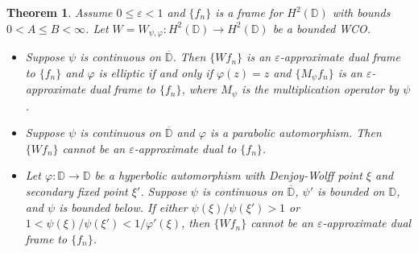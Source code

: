 \documentclass{amsart}
\newtheorem{thm}{Theorem}[section]
\theoremstyle{definition}
\theoremstyle{remark}
\numberwithin{equation}{section}
\begin{document}
\begin{thm}\label{approx_dual}
    Assume $0\leq \varepsilon< 1$ and $\{f_{n}\}$ is a frame for $H^{2}(\mathbb{D})$ with bounds $0<A\leq B<\infty$. Let $W=W_{\psi,\varphi}:H^{2}(\mathbb{D})\to H^{2}(\mathbb{D})$ be a bounded WCO. 
    \begin{itemize}
        \item[1.] Suppose $\psi$ is continuous on $\overline{\mathbb{D}}$. Then $\{Wf_{n}\}$ is an $\varepsilon$-approximate dual frame to $\{f_{n}\}$ and $\varphi$ is elliptic if and only if $\varphi(z)=z$ and $\{M_{\psi}f_{n}\}$ is an $\varepsilon$-approximate dual frame to $\{f_{n}\}$, where $M_{\psi}$ is the multiplication operator by $\psi$.
        \item[2.] Suppose $\psi$ is continuous on $\overline{\mathbb{D}}$ and $\varphi$ is a parabolic automorphism. Then $\{Wf_{n}\}$ cannot be an $\varepsilon$-approximate dual to $\{f_{n}\}$. 
        \item[3.] Let $\varphi:\mathbb{D}\to\mathbb{D}$ be a hyperbolic automorphism with Denjoy-Wolff point $\xi$ and secondary fixed point $\xi'$. Suppose $\psi$ is continuous on $\overline{\mathbb{D}}$, $\psi'$ is bounded on $\mathbb{D}$, and $\psi$ is bounded below. If either $\psi(\xi)/\psi(\xi')>1$ or $1<\psi(\xi)/\psi(\xi')<1/\varphi'(\xi)$, then $\{Wf_{n}\}$ cannot be an $\varepsilon$-approximate dual frame to $\{f_{n}\}$.
    \end{itemize}
\end{thm}
\end{document}
